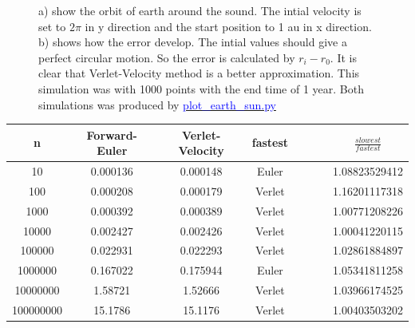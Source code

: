 \begin{figure}[H]
\begin{subfigure}{0.5\textwidth}
        \caption{}
    \end{subfigure}
    \caption{a) show the orbit of earth around the sound. The intial velocity is set to $2\pi$ in y direction and the start position to 1 au in x direction. b) shows how the error develop. The intial values should give a perfect circular motion. So the error is calculated by $r_i - r_{0}$. It is clear that Verlet-Velocity method is a better approximation. This simulation was with 1000 points with the end time of 1 year. Both simulations was produced by \href{https://github.com/erikfsk/Project-3/tree/master/Project3/earth-sun-standard-results}{\textcolor{blue}{plot\_earth\_sun.py}}}
    \label{fig:earth-sun}
\end{figure}


\begin{center}
\label{table:euler-verlet-time}
\begin{tabularx}{\textwidth}{c c c c c c c c}
    \hline 
    \hline 
    n & Forward-Euler & Verlet-Velocity &  fastest &&&& $\frac{slowest}{fastest}$\\ 
    \hline
    10 & 0.000136 & 0.000148 & Euler &&&&   1.08823529412   \\ 
    100 & 0.000208 & 0.000179 & Verlet &&&&   1.16201117318   \\ 
    1000 & 0.000392 & 0.000389 & Verlet &&&&  1.00771208226   \\ 
    10000 & 0.002427 & 0.002426 & Verlet &&&&   1.00041220115  \\ 
    100000 & 0.022931 & 0.022293 & Verlet &&&&   1.02861884897   \\ 
    1000000 & 0.167022 & 0.175944 & Euler &&&&   1.05341811258  \\ 
    10000000 & 1.58721 & 1.52666 & Verlet &&&&   1.03966174525  \\ 
    100000000 & 15.1786 & 15.1176 & Verlet &&&&   1.00403503202  \\ 
    \hline
\end{tabularx}
\end{center}














